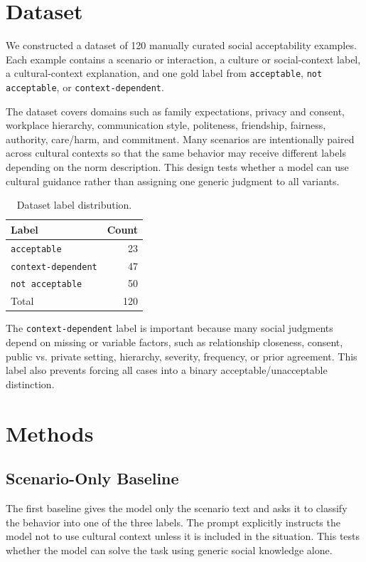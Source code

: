 \section{Dataset}

We constructed a dataset of 120 manually curated social acceptability examples. Each example contains a scenario or interaction, a culture or social-context label, a cultural-context explanation, and one gold label from \texttt{acceptable}, \texttt{not acceptable}, or \texttt{context-dependent}.

The dataset covers domains such as family expectations, privacy and consent, workplace hierarchy, communication style, politeness, friendship, fairness, authority, care/harm, and commitment. Many scenarios are intentionally paired across cultural contexts so that the same behavior may receive different labels depending on the norm description. This design tests whether a model can use cultural guidance rather than assigning one generic judgment to all variants.

\begin{table}[h]
\centering
\small
\begin{tabular}{lr}
\hline
Label & Count \\
\hline
\texttt{acceptable} & 23 \\
\texttt{context-dependent} & 47 \\
\texttt{not acceptable} & 50 \\
\hline
Total & 120 \\
\hline
\end{tabular}
\caption{Dataset label distribution.}
\end{table}

The \texttt{context-dependent} label is important because many social judgments depend on missing or variable factors, such as relationship closeness, consent, public vs. private setting, hierarchy, severity, frequency, or prior agreement. This label also prevents forcing all cases into a binary acceptable/unacceptable distinction.

\section{Methods}

\subsection{Scenario-Only Baseline}

The first baseline gives the model only the scenario text and asks it to classify the behavior into one of the three labels. The prompt explicitly instructs the model not to use cultural context unless it is included in the situation. This tests whether the model can solve the task using generic social knowledge alone.

